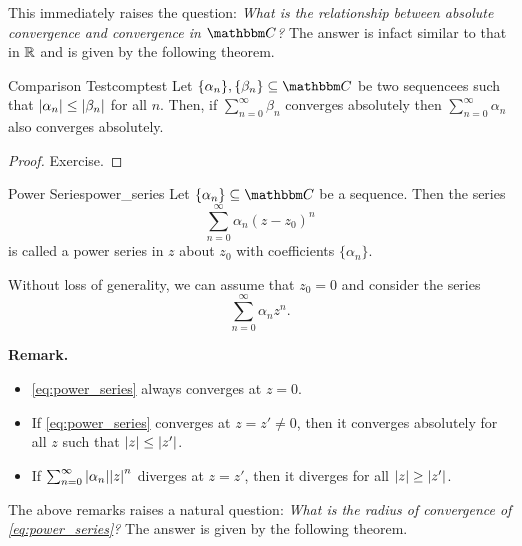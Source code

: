 \documentclass[../ComplexAnalysis_Notes.tex]{subfiles}
\begin{document}
This immediately raises the question: \textit{What is the relationship between absolute convergence and convergence in \(\C\)?} The answer is infact similar to that in \(\mathbb{R}\) and is given by the following theorem.

\begin{Thm}{Comparison Test}{comptest}
  Let \(\{\alpha_n\}, \{\beta_n\} \subseteq \C\) be two sequencees such that \(\abs{\alpha_n} \leq \abs{\beta_n}\) for all \(n\). Then, if \(\sum_{n = 0}^{\infty} \beta_n\) converges absolutely then \(\sum_{n = 0}^{\infty} \alpha_n\) also converges absolutely.
\end{Thm}
\begin{proof}
  Exercise.
\end{proof}


\begin{Def}{Power Series}{power_series}
  Let \(\{\alpha_n\} \subseteq \C\) be a sequence. Then the series
  \[
    \sum_{n = 0}^{\infty} \alpha_n (z - z_0)^n
  \]
  is called a power series in \(z\) about \(z_0\) with coefficients \(\{\alpha_n\}\).
\end{Def}

Without loss of generality, we can assume that \(z_0 = 0\) and consider the series
\begin{equation}
  \sum_{n = 0}^{\infty} \alpha_n z^n.
  \label{eq:power_series}
\end{equation}

\textbf{Remark.}

\begin{itemize}
  \item \eqref{eq:power_series} always converges at \(z = 0\).
  \item If \eqref{eq:power_series} converges at \(z = z' \neq 0\), then it converges absolutely for all \(z\) such that \(\abs{z} \leq \abs{z'}\).
  \item If \(\sum_{n = 0}^{\infty} \abs{\alpha_n} \abs{z}^n\) diverges at \(z = z'\), then it diverges for all \(\abs{z} \geq \abs{z'}\).
\end{itemize}

The above remarks raises a natural question: \textit{What is the radius of convergence of \eqref{eq:power_series}?} The answer is given by the following theorem.
\end{document}
